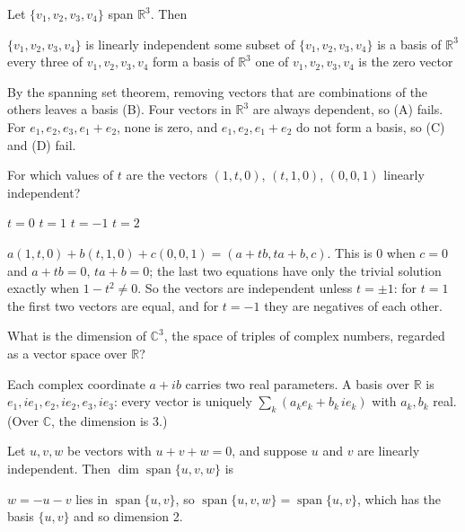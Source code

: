 \begin{question}[id=basis-17]
Let $\{v_1, v_2, v_3, v_4\}$ span $\mathbb{R}^3$. Then
\begin{options}
  \option $\{v_1, v_2, v_3, v_4\}$ is linearly independent
  \correct some subset of $\{v_1, v_2, v_3, v_4\}$ is a basis of $\mathbb{R}^3$
  \option every three of $v_1, v_2, v_3, v_4$ form a basis of $\mathbb{R}^3$
  \option one of $v_1, v_2, v_3, v_4$ is the zero vector
\end{options}
\begin{solution}
By the spanning set theorem, removing vectors that are combinations of the others leaves a basis (B). Four vectors in $\mathbb{R}^3$ are always dependent, so (A) fails. For $e_1, e_2, e_3, e_1 + e_2$, none is zero, and $e_1, e_2, e_1 + e_2$ do not form a basis, so (C) and (D) fail.
\end{solution}
\end{question}

\begin{question}[id=basis-18, type=msq, marks=2]
For which values of $t$ are the vectors $(1, t, 0)$, $(t, 1, 0)$, $(0, 0, 1)$ linearly independent?
\begin{options}
  \correct $t = 0$
  \option $t = 1$
  \option $t = -1$
  \correct $t = 2$
\end{options}
\begin{solution}
$a(1, t, 0) + b(t, 1, 0) + c(0, 0, 1) = (a + tb, ta + b, c)$. This is 0 when $c = 0$ and $a + tb = 0$, $ta + b = 0$; the last two equations have only the trivial solution exactly when $1 - t^2 \ne 0$. So the vectors are independent unless $t = \pm 1$: for $t = 1$ the first two vectors are equal, and for $t = -1$ they are negatives of each other.
\end{solution}
\end{question}

\begin{question}[id=basis-19]
What is the dimension of $\mathbb{C}^3$, the space of triples of complex numbers, regarded as a vector space over $\mathbb{R}$?
\begin{solution}
Each complex coordinate $a + ib$ carries two real parameters. A basis over $\mathbb{R}$ is $e_1, ie_1, e_2, ie_2, e_3, ie_3$: every vector is uniquely $\sum_k (a_k e_k + b_k\, ie_k)$ with $a_k, b_k$ real. (Over $\mathbb{C}$, the dimension is 3.)
\end{solution}
\end{question}

\begin{question}[id=basis-20]
Let $u, v, w$ be vectors with $u + v + w = 0$, and suppose $u$ and $v$ are linearly independent. Then $\dim \operatorname{span}\{u, v, w\}$ is
\begin{options}
\end{options}
\begin{solution}
$w = -u - v$ lies in $\operatorname{span}\{u, v\}$, so $\operatorname{span}\{u, v, w\} = \operatorname{span}\{u, v\}$, which has the basis $\{u, v\}$ and so dimension 2.
\end{solution}
\end{question}

